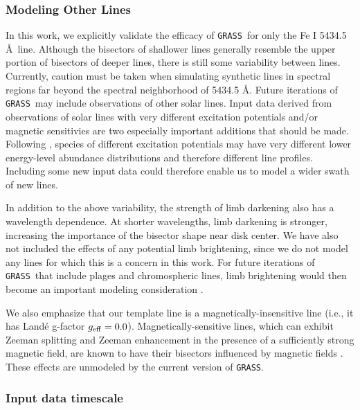 \documentclass[twocolumn]{aastex63}
\newcommand{\grass}{\texttt{GRASS}}
\newcommand{\revise}[1]{#1}
\begin{document}
\subsubsection{Modeling Other Lines}
In this work, we explicitly validate the efficacy of \grass\ for only the Fe \textsc{I} 5434.5 \AA\ line. Although the bisectors of shallower lines generally resemble the upper portion of bisectors of deeper lines, there is still some variability between lines. Currently, caution must be taken when simulating synthetic lines in spectral regions far beyond the spectral neighborhood of 5434.5 \AA. Future iterations of \grass\ may include observations of other solar lines. Input data derived from observations of solar lines with very different excitation potentials \revise{and/or magnetic sensitivies are two} especially important \revise{additions} that should be made. Following \citet{Gray2008}, species of different excitation potentials may have very different lower energy-level abundance distributions and therefore different line profiles. Including some new input data could therefore enable us to model a wider swath of new lines. \par 

In addition to the above variability, the strength of limb darkening also has a wavelength dependence. At shorter wavelengths, limb darkening is stronger, increasing the importance of the bisector shape near disk center. We have also not included the effects of any potential limb brightening, since we do not model any lines for which this is a concern in this work. For future iterations of \grass\ that include plages and chromospheric lines, limb brightening would then become an important modeling consideration \citep{Meunier2010, Dumusque2014}. \par 

We also emphasize that our template line is a magnetically-insensitive line (i.e., it has Land{\'e} g-factor $g_{\rm eff} = 0.0$). Magnetically-sensitive lines, which can exhibit Zeeman splitting and Zeeman enhancement in the presence of a sufficiently strong magnetic field, are known to have their bisectors influenced by magnetic fields \citep[e.g.,][]{Cavallini1988, Brandt1990}. These effects are unmodeled by the current version of \grass. \par

\subsubsection{Input data timescale} \label{subsubsec:timescale}
\end{document}

